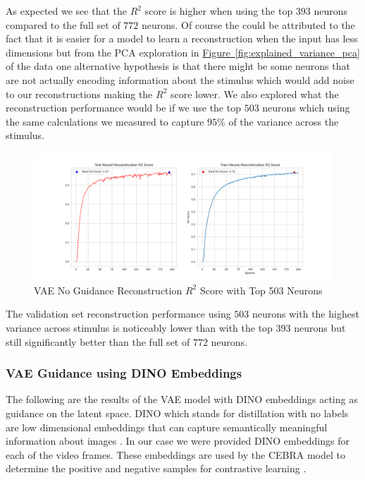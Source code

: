 \documentclass[12pt, letterpaper]{article}
\begin{document}
As expected we see that the $R^2$ score is higher when using the top $393$ neurons compared to the full set of $772$ neurons. Of course the could be attributed to the fact that it is easier for a model to learn a reconstruction when the input has less dimensions but from the PCA exploration in \hyperref[fig:explained_variance_pca]{Figure~\ref{fig:explained_variance_pca}} of the data one alternative hypothesis is that there might be some neurons that are not actually encoding information about the stimulus which would add noise to our reconstructions making the $R^2$ score lower. We also explored what the reconstruction performance would be if we use the top $503$ neurons which using the same calculations we measured to capture $95\%$ of the variance across the stimulus.

\begin{figure}[H]
    \centering
    \includegraphics[width=1.0\textwidth]{x_r2_128dim_503_top_var_200_epochs_0.05_beta_2_layer.png}
    \caption{VAE No Guidance Reconstruction $R^2$ Score with Top 503 Neurons}
    \label{fig:vae_no_guidance_top503}
\end{figure}

The validation set reconstruction performance using $503$ neurons with the highest variance across stimulus is noticeably lower than with the top $393$ neurons but still significantly better than the full set of $772$ neurons. 

\subsubsection{VAE Guidance using DINO Embeddings}
\label{subsubsec:vae_guidance_DINO}
The following are the results of the VAE model with DINO embeddings acting as guidance on the latent space. DINO which stands for distillation with no labels are low dimensional embeddings that can capture semantically meaningful information about images \cite{dino}. In our case we were provided DINO \cite{dino} embeddings for each of the video frames. These embeddings are used by the CEBRA model to determine the positive and negative samples for contrastive learning \cite{schneider2023}.
\end{document}
